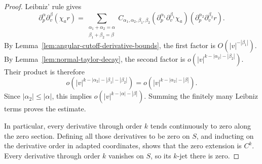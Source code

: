 \documentclass[10pt,a4paper]{amsart}
\begin{document}
\begin{proof}
Leibniz' rule gives
\[
  \partial_p^\alpha
  \partial_v^\beta
  (\chi_ar)
  =
  \sum_{
    \substack{
      \alpha_1+\alpha_2=\alpha\\
      \beta_1+\beta_2=\beta
    }
  }
  C_{\alpha_1,\alpha_2,\beta_1,\beta_2}
  \left(
    \partial_p^{\alpha_1}
    \partial_v^{\beta_1}\chi_a
  \right)
  \left(
    \partial_p^{\alpha_2}
    \partial_v^{\beta_2}r
  \right).
\]
By
Lemma~\ref{lem:angular-cutoff-derivative-bounds},
the first factor is
\(O \left( |v|^{-|\beta_1|} \right)\).
By
Lemma~\ref{lem:normal-taylor-decay},
the second factor is
\(o \left( |v|^{ k-|\alpha_2|-|\beta_2| } \right)\).
Their product is therefore
\[
  o
  \left(
    |v|^{
      k-|\alpha_2|-|\beta_1|-|\beta_2|
    }
  \right)
  =
  o
  \left(
    |v|^{
      k-|\alpha_2|-|\beta|
    }
  \right).
\]
Since
\(|\alpha_2|\leq|\alpha|\),
this implies
\(o \left( |v|^{k-|\alpha|-|\beta|} \right)\).
Summing the finitely many Leibniz terms proves the estimate.

In particular, every derivative through order \(k\) tends
continuously to zero along the zero section. Defining all those
derivatives to be zero on \(S\), and inducting on the derivative order
in adapted coordinates, shows that the zero extension is \(C^k\).
Every derivative through order \(k\) vanishes on \(S\), so its
\(k\)-jet there is zero.
\end{proof}
\end{document}
